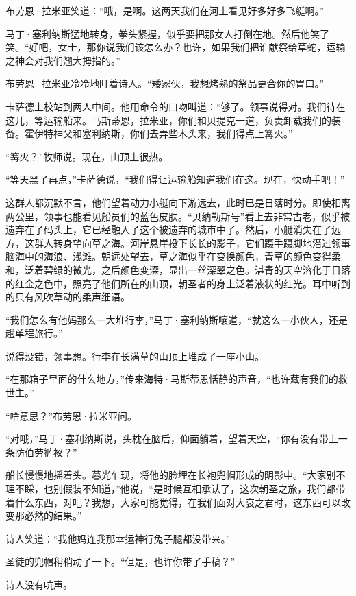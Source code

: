\documentclass[AutoFakeBold=true]{book}
\begin{document}
布劳恩·拉米亚笑道：``哦，是啊。这两天我们在河上看见好多好多飞艇啊。''

马丁·塞利纳斯猛地转身，拳头紧握，似乎要把那女人打倒在地。然后他笑了笑。``好吧，女士，那你说我们该怎么办？也许，如果我们把谁献祭给草蛇，运输之神会对我们翘大拇指的。''

布劳恩·拉米亚冷冷地盯着诗人。``矮家伙，我想烤熟的祭品更合你的胃口。''

卡萨德上校站到两人中间。他用命令的口吻叫道：``够了。领事说得对。我们待在这儿，等运输船来。马斯蒂恩，拉米亚，你们和贝提克一道，负责卸载我们的装备。霍伊特神父和塞利纳斯，你们去弄些木头来，我们得点上篝火。''

``篝火？''牧师说。现在，山顶上很热。

``等天黑了再点，''卡萨德说，``我们得让运输船知道我们在这。现在，快动手吧！''

\vspace*{1em}

这群人都沉默不言，他们望着动力小艇向下游远去，此时已是日落时分。即使相离两公里，领事也能看见船员们的蓝色皮肤。``贝纳勒斯号''看上去非常古老，似乎被遗弃在了码头上，它已经融入了这个被遗弃的城市中了。然后，小艇消失在了远方，这群人转身望向草之海。河岸悬崖投下长长的影子，它们蹑手蹑脚地潜过领事脑海中的海浪、浅滩。朝远处望去，草之海似乎在变换颜色，青草的颜色变得柔和，泛着碧绿的微光，之后颜色变深，显出一丝深翠之色。湛青的天空溶化于日落的红金之色中，照亮了他们所在的山顶，朝圣者的身上泛着液状的红光。耳中听到的只有风吹草动的柔声细语。

``我们怎么有他妈那么一大堆行李，''马丁·塞利纳斯嚷道，``就这么一小伙人，还是趟单程旅行。''

说得没错，领事想。行李在长满草的山顶上堆成了一座小山。

``在那箱子里面的什么地方，''传来海特·马斯蒂恩恬静的声音，``也许藏有我们的救世主。''

``啥意思？''布劳恩·拉米亚问。

``对哦，''马丁·塞利纳斯说，头枕在脑后，仰面躺着，望着天空，``你有没有带上一条防伯劳裤衩？''

船长慢慢地摇着头。暮光乍现，将他的脸埋在长袍兜帽形成的阴影中。``大家别不理不睬，也别假装不知道，''他说，``是时候互相承认了，这次朝圣之旅，我们都带着什么东西，对吧？我想，大家可能觉得，在我们面对大哀之君时，这东西可以改变那必然的结果。''

诗人笑道：``我他妈连我那幸运神行兔子腿都没带来。''

圣徒的兜帽稍稍动了一下。``但是，也许你带了手稿？''

诗人没有吭声。
\end{document}

